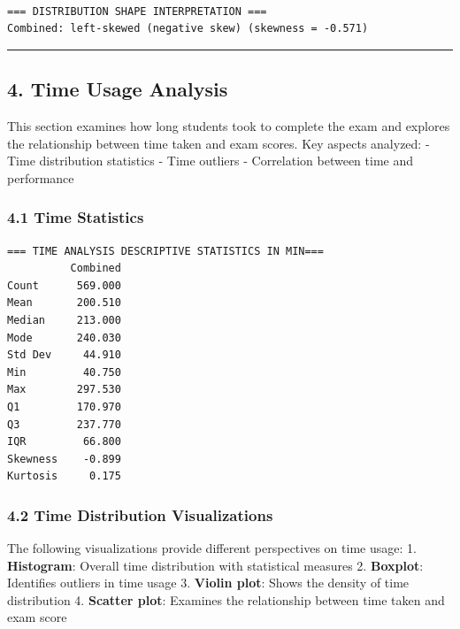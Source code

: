 \documentclass[11pt]{article}
\begin{document}
    \begin{center}
    \end{center}
    { \hspace*{\fill} \\}
    
    \begin{Verbatim}[commandchars=\\\{\}]
=== DISTRIBUTION SHAPE INTERPRETATION ===
Combined: left-skewed (negative skew) (skewness = -0.571)
    \end{Verbatim}

    \begin{center}\rule{0.5\linewidth}{0.5pt}\end{center}

    \subsection{4. Time Usage Analysis}\label{time-usage-analysis}

This section examines how long students took to complete the exam and
explores the relationship between time taken and exam scores. Key
aspects analyzed: - Time distribution statistics - Time outliers -
Correlation between time and performance

    \subsubsection{4.1 Time Statistics}\label{time-statistics}

    \begin{Verbatim}[commandchars=\\\{\}]
=== TIME ANALYSIS DESCRIPTIVE STATISTICS IN MIN===
          Combined
Count      569.000
Mean       200.510
Median     213.000
Mode       240.030
Std Dev     44.910
Min         40.750
Max        297.530
Q1         170.970
Q3         237.770
IQR         66.800
Skewness    -0.899
Kurtosis     0.175
    \end{Verbatim}

    \subsubsection{4.2 Time Distribution
Visualizations}\label{time-distribution-visualizations}

The following visualizations provide different perspectives on time
usage: 1. \textbf{Histogram}: Overall time distribution with statistical
measures 2. \textbf{Boxplot}: Identifies outliers in time usage 3.
\textbf{Violin plot}: Shows the density of time distribution 4.
\textbf{Scatter plot}: Examines the relationship between time taken and
exam score
\end{document}
